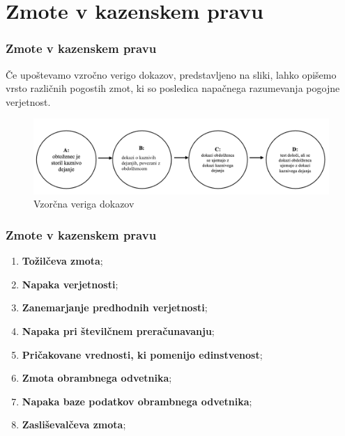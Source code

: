 \documentclass{beamer}
\begin{document}
\section{Zmote v kazenskem pravu}

\begin{frame}
    \frametitle{Zmote v kazenskem pravu}
    Če upoštevamo vzročno verigo dokazov, predstavljeno na sliki, lahko opišemo vrsto različnih pogostih zmot, ki so posledica napačnega razumevanja pogojne verjetnost. 
    \begin{figure}[!ht]\label{fig:slika_3}
        \centering
        \includegraphics[scale=0.50]{slika_3.png}
        \caption{Vzorčna veriga dokazov}
    \end{figure}
\end{frame}

\begin{frame}
    \frametitle{Zmote v kazenskem pravu}
    \begin{enumerate}
        \item \textbf{Tožilčeva zmota};
        \item \textbf{Napaka verjetnosti};
        \item \textbf{Zanemarjanje predhodnih verjetnosti};
        \item \textbf{Napaka pri številčnem preračunavanju};
        \item \textbf{Pričakovane vrednosti, ki pomenijo edinstvenost};
        \item \textbf{Zmota obrambnega odvetnika};
        \item \textbf{Napaka baze podatkov obrambnega odvetnika};
        \item \textbf{Zasliševalčeva zmota};
    \end{enumerate}
\end{frame}

\end{document}
